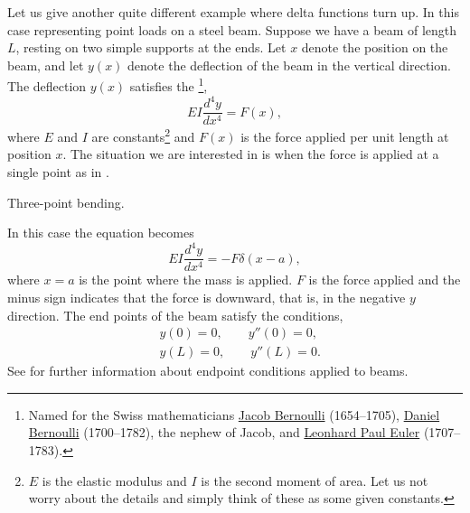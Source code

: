 Let us give another quite different
example where delta functions turn up.  In this case 
representing point loads on a steel beam.  Suppose we have a beam
of length $L$, resting on two simple supports at the ends.  Let $x$ denote
the position on the beam, and let $y(x)$ denote the deflection of the beam in
the vertical direction.  The deflection $y(x)$ satisfies the
\emph{}%
\footnote{Named for the Swiss mathematicians
\href{https://en.wikipedia.org/wiki/Jacob_Bernoulli}{Jacob Bernoulli}
(1654--1705),
\href{https://en.wikipedia.org/wiki/Daniel_Bernoulli}{Daniel Bernoulli}
(1700--1782), the nephew of Jacob,
and
\href{https://en.wikipedia.org/wiki/Euler}{Leonhard Paul Euler}
(1707--1783).},
\begin{equation*}
EI \frac{d^4 y}{dx^4} = F(x) ,
\end{equation*}
where $E$ and $I$ are constants\footnote{$E$ is the elastic modulus and $I$
is the second moment of area.  Let us not worry about the details and simply
think of these as some given constants.} and
$F(x)$ is the force applied per unit length at position $x$.  The situation
we are interested in is when the force is applied at a single point as in
.

\begin{myfig}
\capstart
{}
\caption{Three-point bending.\label{lt:beambendingfig}}
\end{myfig}

In this case the equation becomes
\begin{equation*}
EI \frac{d^4 y}{dx^4} = -F \delta(x-a) ,
\end{equation*}
where $x=a$ is the point where the mass is applied.  $F$ is the force
applied and the minus sign indicates that the force is downward, that is, in the
negative $y$ direction.  The end points of the
beam satisfy the conditions,
\begin{align*}
& y(0) = 0, \qquad y''(0) = 0, \\
& y(L) = 0, \qquad y''(L) = 0.
\end{align*}
See  for further information about endpoint
conditions applied to beams.


